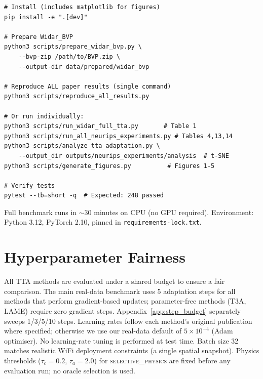 \begin{verbatim}
# Install (includes matplotlib for figures)
pip install -e ".[dev]"

# Prepare Widar_BVP
python3 scripts/prepare_widar_bvp.py \
    --bvp-zip /path/to/BVP.zip \
    --output-dir data/prepared/widar_bvp

# Reproduce ALL paper results (single command)
python3 scripts/reproduce_all_results.py

# Or run individually:
python3 scripts/run_widar_full_tta.py       # Table 1
python3 scripts/run_all_neurips_experiments.py # Tables 4,13,14
python3 scripts/analyze_tta_adaptation.py \
    --output_dir outputs/neurips_experiments/analysis  # t-SNE
python3 scripts/generate_figures.py          # Figures 1-5

# Verify tests
pytest --tb=short -q  # Expected: 248 passed
\end{verbatim}

Full benchmark runs in $\sim$30 minutes on CPU (no GPU required). Environment: Python 3.12, PyTorch 2.10, pinned in \texttt{requirements-lock.txt}.

\section{Hyperparameter Fairness}
\label{app:hyperparams}

All TTA methods are evaluated under a shared budget to ensure a fair comparison.
The main real-data benchmark uses 5 adaptation steps for all methods that perform gradient-based updates; parameter-free methods (T3A, LAME) require zero gradient steps. Appendix~\ref{app:step_budget} separately sweeps 1/3/5/10 steps.
Learning rates follow each method's original publication where specified; otherwise we use our real-data default of $5 \times 10^{-4}$ (Adam optimiser).
No learning-rate tuning is performed at test time.
Batch size 32 matches realistic WiFi deployment constraints (a single spatial snapshot).
Physics thresholds ($\tau_c = 0.2$, $\tau_a = 2.0$) for \textsc{selective\_physics} are fixed before any evaluation run; no oracle selection is used.

